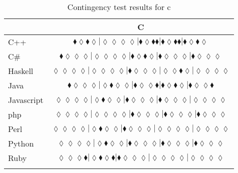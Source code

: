
\begin{table*}
\centering
\begin{tabular}{l c}
& C \\
\hline

C++ & $\scriptscriptstyle\blacklozenge\lozenge\blacklozenge\lozenge|\lozenge\lozenge\lozenge\lozenge|\blacklozenge\lozenge\blacklozenge\blacklozenge|\blacklozenge\lozenge\blacklozenge\blacklozenge|\blacklozenge\lozenge\blacklozenge\lozenge$ \\
C\# & $\scriptscriptstyle\blacklozenge\lozenge\lozenge\lozenge|\lozenge\lozenge\lozenge\lozenge|\blacklozenge\lozenge\blacklozenge\lozenge|\blacklozenge\lozenge\lozenge\lozenge|\blacklozenge\lozenge\lozenge\lozenge$ \\
Haskell & $\scriptscriptstyle\lozenge\lozenge\lozenge\lozenge|\lozenge\lozenge\lozenge\lozenge|\blacklozenge\lozenge\lozenge\lozenge|\lozenge\lozenge\blacklozenge\lozenge|\lozenge\lozenge\lozenge\lozenge$ \\
Java & $\scriptscriptstyle\blacklozenge\lozenge\lozenge\lozenge|\lozenge\blacklozenge\lozenge\lozenge|\blacklozenge\lozenge\lozenge\blacklozenge|\blacklozenge\lozenge\blacklozenge\lozenge|\blacklozenge\lozenge\lozenge\blacklozenge$ \\
Javascript & $\scriptscriptstyle\lozenge\lozenge\lozenge\lozenge|\lozenge\blacklozenge\lozenge\lozenge|\blacklozenge\lozenge\lozenge\lozenge|\blacklozenge\lozenge\lozenge\lozenge|\lozenge\lozenge\lozenge\lozenge$ \\
{\sc php} & $\scriptscriptstyle\lozenge\lozenge\lozenge\lozenge|\lozenge\lozenge\lozenge\lozenge|\blacklozenge\lozenge\lozenge\lozenge|\blacklozenge\lozenge\lozenge\lozenge|\blacklozenge\lozenge\lozenge\lozenge$ \\
Perl & $\scriptscriptstyle\lozenge\lozenge\lozenge\lozenge|\lozenge\blacklozenge\lozenge\lozenge|\blacklozenge\lozenge\lozenge\lozenge|\lozenge\lozenge\lozenge\lozenge|\lozenge\lozenge\lozenge\lozenge$ \\
Python & $\scriptscriptstyle\lozenge\lozenge\lozenge\lozenge|\lozenge\blacklozenge\lozenge\lozenge|\blacklozenge\lozenge\lozenge\lozenge|\blacklozenge\lozenge\lozenge\lozenge|\blacklozenge\lozenge\lozenge\lozenge$ \\
Ruby & $\scriptscriptstyle\lozenge\lozenge\lozenge\blacklozenge|\lozenge\blacklozenge\lozenge\blacklozenge|\blacklozenge\lozenge\lozenge\lozenge|\lozenge\lozenge\lozenge\lozenge|\lozenge\lozenge\lozenge\lozenge$ \\

\hline
& \\
\end{tabular}
\caption{Contingency test results for c}
\label{tbl:contingency-test-results-c}
\end{table*}


